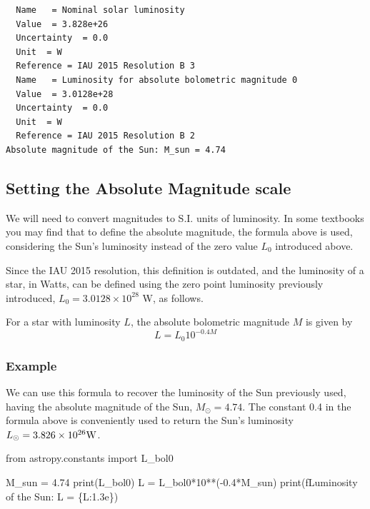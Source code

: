 \documentclass[
  letterpaper,
  DIV=11,
  numbers=noendperiod]{scrreprt}
\newenvironment{Shaded}{\begin{snugshade}}{\end{snugshade}}
\newcommand{\BuiltInTok}[1]{\textcolor[rgb]{0.00,0.23,0.31}{#1}}
\newcommand{\DecValTok}[1]{\textcolor[rgb]{0.68,0.00,0.00}{#1}}
\newcommand{\FloatTok}[1]{\textcolor[rgb]{0.68,0.00,0.00}{#1}}
\newcommand{\ImportTok}[1]{\textcolor[rgb]{0.00,0.46,0.62}{#1}}
\newcommand{\NormalTok}[1]{\textcolor[rgb]{0.00,0.23,0.31}{#1}}
\newcommand{\OperatorTok}[1]{\textcolor[rgb]{0.37,0.37,0.37}{#1}}
\newcommand{\SpecialCharTok}[1]{\textcolor[rgb]{0.37,0.37,0.37}{#1}}
\newcommand{\SpecialStringTok}[1]{\textcolor[rgb]{0.13,0.47,0.30}{#1}}
\begin{document}
\begin{verbatim}
  Name   = Nominal solar luminosity
  Value  = 3.828e+26
  Uncertainty  = 0.0
  Unit  = W
  Reference = IAU 2015 Resolution B 3
  Name   = Luminosity for absolute bolometric magnitude 0
  Value  = 3.0128e+28
  Uncertainty  = 0.0
  Unit  = W
  Reference = IAU 2015 Resolution B 2
Absolute magnitude of the Sun: M_sun = 4.74
\end{verbatim}

\hypertarget{setting-the-absolute-magnitude-scale}{%
\subsection{Setting the Absolute Magnitude
scale}\label{setting-the-absolute-magnitude-scale}}

We will need to convert magnitudes to S.I. units of luminosity. In some
textbooks you may find that to define the absolute magnitude, the
formula above is used, considering the Sun's luminosity instead of the
zero value \(L_0\) introduced above.

Since the IAU 2015 resolution, this definition is outdated, and the
luminosity of a star, in Watts, can be defined using the zero point
luminosity previously introduced, \(L_0=3.0128\times 10^{28}\) W, as
follows.

For a star with luminosity \(L\), the absolute bolometric magnitude
\(M\) is given by \begin{equation}
L = L_0 10^{-0.4 M}
\end{equation}

\hypertarget{example}{%
\subsubsection{Example}\label{example}}

We can use this formula to recover the luminosity of the Sun previously
used, having the absolute magnitude of the Sun, \(M_\odot = 4.74\). The
constant 0.4 in the formula above is conveniently used to return the
Sun's luminosity \(L_\odot = 3.826 \times 10^{26}\rm{W}\).

\begin{Shaded}
\begin{Highlighting}[]
\ImportTok{from}\NormalTok{ astropy.constants }\ImportTok{import}\NormalTok{ L\_bol0}

\NormalTok{M\_sun }\OperatorTok{=} \FloatTok{4.74}
\BuiltInTok{print}\NormalTok{(L\_bol0)}
\NormalTok{L }\OperatorTok{=}\NormalTok{ L\_bol0}\OperatorTok{*}\DecValTok{10}\OperatorTok{**}\NormalTok{(}\OperatorTok{{-}}\FloatTok{0.4}\OperatorTok{*}\NormalTok{M\_sun)}
\BuiltInTok{print}\NormalTok{(}\SpecialStringTok{f\textquotesingle{}Luminosity of the Sun: L = }\SpecialCharTok{\{}\NormalTok{L}\SpecialCharTok{:1.3e\}}\SpecialStringTok{\textquotesingle{}}\NormalTok{)}
\end{Highlighting}
\end{Shaded}
\end{document}
